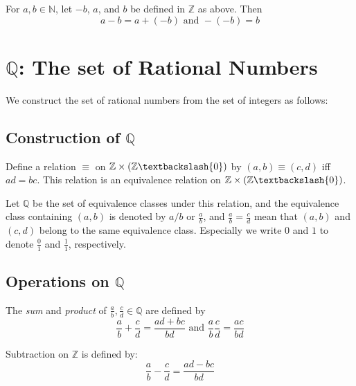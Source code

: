 \documentclass{report}
\begin{document}
		\begin{prop}
			For $a,b \in \mathbb{N}$, let $-b$, $a$, and $b$ be defined in $\mathbb{Z}$ as above. Then
			\begin{displaymath}
				a-b=a+(-b) \text{   and   } -(-b)=b
			\end{displaymath}
		\end{prop}

	\section{$\mathbb{Q}$: The set of Rational Numbers}
		We construct the set of rational numbers from the set of integers as follows:
		\subsection{Construction of $\mathbb{Q}$}
		
			\begin{prop}\label{def_Q_equiv_class}
				Define a relation $\equiv$ on $\mathbb{Z} \times (\mathbb{Z} \textbackslash \{0\})$ by $(a,b)\equiv(c,d)$ iff $ad=bc$. This relation is an equivalence relation on $\mathbb{Z} \times (\mathbb{Z} \textbackslash \{0\})$.
			\end{prop}
		
			Let $\mathbb{Q}$ be the set of equivalence classes under this relation, and the equivalence class containing $(a,b)$ is denoted by $a/b$ or $\frac{a}{b}$, and $\frac{a}{b}=\frac{c}{d}$ mean that $(a,b)$ and $(c,d)$ belong to the same equivalence class. Especially we write $0$ and $1$ to denote $\frac{0}{1}$ and $\frac{1}{1}$, respectively.
		
		\subsection{Operations on $\mathbb{Q}$}
		
			\begin{defn} \label{def_add_mult_Q}
				The \emph{sum} and \emph{product} of $\frac{a}{b}, \frac{c}{d} \in \mathbb{Q}$ are defined by
				\begin{displaymath}
					\frac{a}{b}+\frac{c}{d}=\frac{ad+bc}{bd} \text{   and   } \frac{a}{b}\frac{c}{d}=\frac{ac}{bd}
				\end{displaymath}
			\end{defn}
		
			\begin{defn} \label{def_sub_Q}
				Subtraction on $\mathbb{Z}$ is defined by:
				\begin{displaymath}
					\frac{a}{b}-\frac{c}{d}=\frac{ad-bc}{bd}
				\end{displaymath}
			\end{defn}
			
\end{document}
